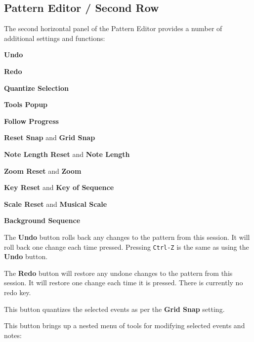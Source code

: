 \subsection{Pattern Editor / Second Row}
\label{subsec:pattern_editor_second_row}

   The second horizontal panel of the Pattern Editor provides a number
   of additional settings and functions:

   \begin{enumber}
      \item \textbf{Undo}
      \item \textbf{Redo}
      \item \textbf{Quantize Selection}
      \item \textbf{Tools Popup}
      \item \textbf{Follow Progress}
      \item \textbf{Reset Snap} and \textbf{Grid Snap}
      \item \textbf{Note Length Reset} and \textbf{Note Length}
      \item \textbf{Zoom Reset} and \textbf{Zoom}
      \item \textbf{Key Reset} and \textbf{Key of Sequence}
      \item \textbf{Scale Reset} and \textbf{Musical Scale}
      \item \textbf{Background Sequence}
   \end{enumber}

   \setcounter{ItemCounter}{0}      %

   The \textbf{Undo} button rolls back any changes to the pattern from this
   session.  It will roll back one change each time pressed.
   Pressing \texttt{Ctrl-Z} is the same as using the \textbf{Undo} button.

   The \textbf{Redo} button will restore any undone changes to the pattern from
   this session.
   It will restore one change each time it is pressed.
   There is currently no redo key.

   This button quantizes the selected events as per
   the \textbf{Grid Snap} setting.

   This button brings up a nested menu of tools for modifying selected
   events and notes:

